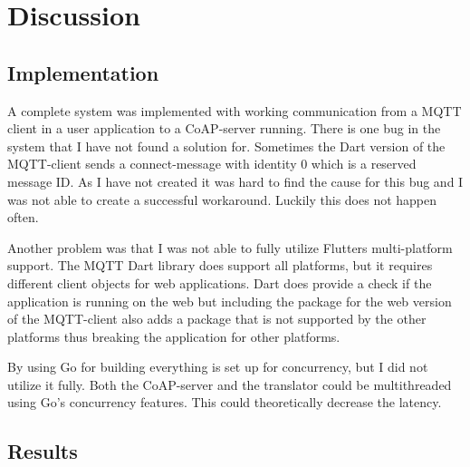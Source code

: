 \section{Discussion}
\label{ch:concl}
\noindent	
\subsection{Implementation}
A complete system was implemented with working communication from a MQTT client in a user application to a CoAP-server running. There is one bug in the system that I have not found a solution for. Sometimes the Dart version of the MQTT-client sends a connect-message with identity 0 which is a reserved message ID. As I have not created it was hard to find the cause for this bug and I was not able to create a successful workaround. Luckily this does not happen often.

Another problem was that I was not able to fully utilize Flutters multi-platform support. The MQTT Dart library does support all platforms, but it requires different client objects for web applications. Dart does provide a check if the application is running on the web but including the package for the web version of the MQTT-client also adds a package that is not supported by the other platforms thus breaking the application for other platforms. 

By using Go for building everything is set up for concurrency, but I did not utilize it fully. Both the CoAP-server and the translator could be multithreaded using Go's concurrency features. This could theoretically decrease the latency.


\subsection{Results}




